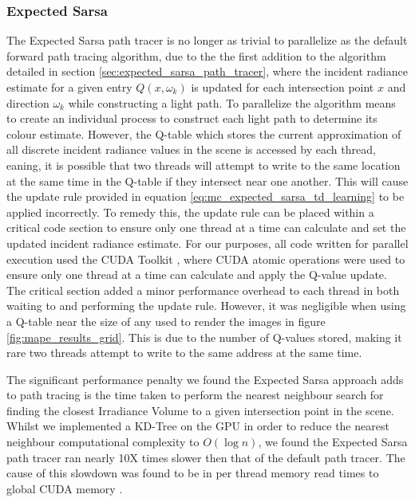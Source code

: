 \documentclass[../dissertation.tex]{subfiles}
\begin{document}
\subsubsection{Expected Sarsa}

The Expected Sarsa path tracer is no longer as trivial to parallelize as the default forward path tracing algorithm, due to the the first addition to the algorithm detailed in section \ref{sec:expected_sarsa_path_tracer}, where the incident radiance estimate for a given entry $Q(x,\omega_k)$ is updated for each intersection point $x$ and direction $\omega_k$ while constructing a light path. To parallelize the algorithm means to create an individual process to construct each light path to determine its colour estimate. However, the Q-table which stores the current approximation of all discrete incident radiance values in the scene is accessed by each thread, eaning, it is possible that two threads will attempt to write to the same location at the same time in the Q-table if they intersect near one another. This will cause the update rule provided in equation \ref{eq:mc_expected_sarsa_td_learning} to be applied incorrectly. To remedy this, the update rule can be placed within a critical code section \cite{raynal2012concurrent} to ensure only one thread at a time can calculate and set the updated incident radiance estimate. For our purposes, all code written for parallel execution used the CUDA Toolkit \cite{cuda}, where CUDA atomic operations were used to ensure only one thread at a time can calculate and apply the Q-value update. The critical section added a minor performance overhead to each thread in both waiting to and performing the update rule. However, it was negligible when using a Q-table near the size of any used to render the images in figure \ref{fig:mape_results_grid}. This is due to the number of Q-values stored, making it rare two threads attempt to write to the same address at the same time.

The significant performance penalty we found the Expected Sarsa approach adds to path tracing is the time taken to perform the nearest neighbour search for finding the closest Irradiance Volume to a given intersection point in the scene. Whilst we implemented a KD-Tree on the GPU in order to reduce the nearest neighbour computational complexity to $O( \log n)$, we found the Expected Sarsa path tracer ran nearly 10X times slower then that of the default path tracer. The cause of this slowdown was found to be in per thread memory read times to global CUDA memory \cite{cuda_c_guide}. 
\end{document}
